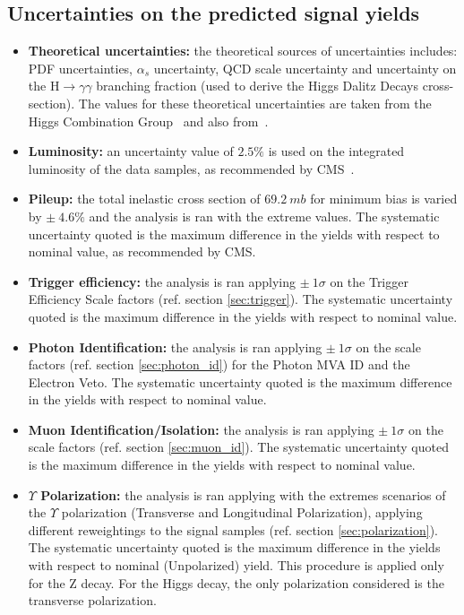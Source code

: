 \subsection{Uncertainties on the predicted signal yields}
\begin{itemize} 
\item \textbf{Theoretical uncertainties:} the theoretical sources of uncertainties includes: PDF uncertainties, $\alpha_{s}$ uncertainty, QCD scale uncertainty and uncertainty on the $\mathrm{H} \to \gamma\gamma$ branching fraction (used to derive the Higgs Dalitz Decays cross-section). The values for these theoretical uncertainties are taken from the Higgs Combination Group~\cite{CERNYellowReportPageAt13TeV} and also from~\cite{Passarino:2013nka}.

\item \textbf{Luminosity:} an uncertainty value of $2.5\%$ is used on the integrated luminosity of the data samples, as recommended by CMS~\cite{CMS-PAS-LUM-17-001}.

\item \textbf{Pileup:} the total inelastic cross section of $69.2~mb$ for minimum bias is varied by $\pm~4.6\%$ and the analysis is ran with the extreme values. The systematic uncertainty quoted is the maximum difference in the yields with respect to nominal value, as recommended by CMS. 

\item \textbf{Trigger efficiency:} the analysis is ran applying $\pm~1\sigma$ on the Trigger Efficiency Scale factors (ref. section \ref{sec:trigger}). The systematic uncertainty quoted is the maximum difference in the yields with respect to nominal value.

\item \textbf{Photon Identification:} the analysis is ran applying $\pm~1\sigma$ on the scale factors (ref. section \ref{sec:photon_id}) for the Photon MVA ID and the Electron Veto. The systematic uncertainty quoted is the maximum difference in the yields with respect to nominal value.

\item \textbf{Muon Identification/Isolation:} the analysis is ran applying $\pm~1\sigma$ on the scale factors (ref. section \ref{sec:muon_id}). The systematic uncertainty quoted is the maximum difference in the yields with respect to nominal value.

\item \textbf{$\Upsilon$ Polarization:} the analysis is ran applying with the extremes scenarios of the $\Upsilon$ polarization (Transverse and Longitudinal Polarization), applying different reweightings to the signal samples (ref. section \ref{sec:polarization}). The systematic uncertainty quoted is the maximum difference in the yields with respect to nominal (Unpolarized) yield. This procedure is applied only for the Z decay. For the Higgs decay, the only polarization considered is the transverse polarization.

\end{itemize}

